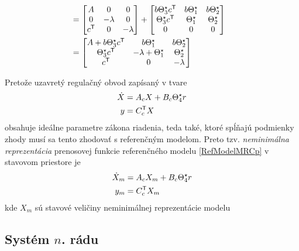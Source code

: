 \documentclass[a4paper, 10pt, ]{article}
\begin{document}
\begin{equation}
\begin{split}
		\\
		&=
		\begin{bmatrix} A & 0 & 0 \\ 0 & -\lambda & 0 \\ c^{\mathsf{T}} & 0 & -\lambda \end{bmatrix}
	 	+
	 	\begin{bmatrix} b \Theta_3^\star c^{\mathsf{T}} & b \Theta_1^\star & b \Theta_2^\star \\ \Theta_3^\star c^{\mathsf{T}} & \Theta_1^\star & \Theta_2^\star \\ 0 & 0 & 0 \end{bmatrix}
		\\
		& =
		\begin{bmatrix} A +  b \Theta_3^\star c^{\mathsf{T}} & b \Theta_1^\star & b \Theta_2^\star \\ \Theta_3^\star c^{\mathsf{T}} & -\lambda + \Theta_1^\star & \Theta_2^\star \\ c^{\mathsf{T}} & 0 & -\lambda \end{bmatrix}
	\end{split}
\end{equation}

Pretože uzavretý regulačný obvod zapísaný v tvare
\begin{subequations} \label{UROaugmentedPlant_02}
	\begin{align}
		\dot X &= A_c X + B_c \Theta_4^\star r \\
		y &= C_c^{\mathsf{T}} X
	\end{align}
\end{subequations}
obsahuje ideálne parametre zákona riadenia, teda také, ktoré spĺňajú podmienky zhody musí sa tento zhodovať s referenčným modelom. Preto tzv. \emph{neminimálna reprezentácia} prenosovej funkcie referenčného modelu \eqref{RefModelMRCp} v stavovom priestore je
\begin{subequations} \label{NeminimalRMMRCp}
	\begin{align}
		\dot X_m &= A_c X_m + B_c \Theta_4^\star r \\
		y_m &= C_c^{\mathsf{T}} X_m
	\end{align}
\end{subequations}
kde $X_m$ sú stavové veličiny neminimálnej reprezentácie modelu










\subsection{Systém $n$. rádu}
\end{document}
